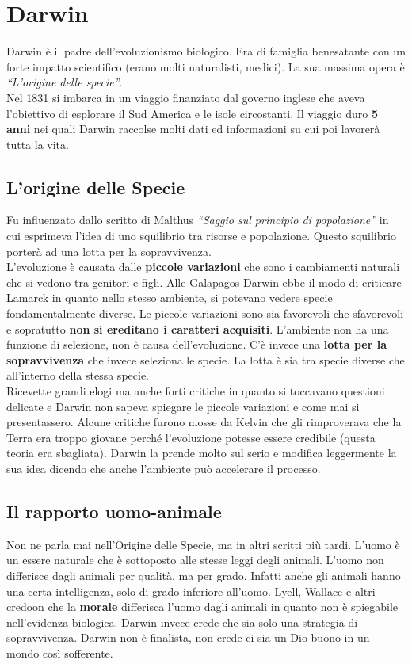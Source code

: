 
\section{Darwin}
Darwin è il padre dell'evoluzionismo biologico. Era di famiglia benesatante con un forte impatto
scientifico (erano molti naturalisti, medici). La sua massima opera è \textit{``L'origine delle 
specie''}.\\
Nel 1831 si imbarca in un viaggio finanziato dal governo inglese che aveva l'obiettivo di esplorare
il Sud America e le isole circostanti. Il viaggio duro \textbf{5 anni} nei quali Darwin raccolse 
molti dati ed informazioni su cui poi lavorerà tutta la vita.

\subsection{L'origine delle Specie}
Fu influenzato dallo scritto di Malthus \textit{``Saggio sul principio di popolazione''} in cui 
esprimeva l'idea di uno squilibrio tra risorse e popolazione. Questo squilibrio porterà ad una lotta
per la sopravvivenza.\\
L'evoluzione è causata dalle \textbf{piccole variazioni} che sono i cambiamenti naturali che si 
vedono tra genitori e figli. Alle Galapagos Darwin ebbe il modo di criticare Lamarck in quanto nello
stesso ambiente, si potevano vedere specie fondamentalmente diverse. Le piccole variazioni sono sia 
favorevoli che sfavorevoli e sopratutto \textbf{non si ereditano i caratteri acquisiti}. L'ambiente
non ha una funzione di selezione, non è causa dell'evoluzione. C'è invece una \textbf{lotta per la
sopravvivenza} che invece seleziona le specie. La lotta è sia tra specie diverse che all'interno 
della stessa specie.\\ [\baselineskip]
Ricevette grandi elogi ma anche forti critiche in quanto si toccavano questioni delicate e Darwin
non sapeva spiegare le piccole variazioni e come mai si presentassero. Alcune critiche furono mosse
da Kelvin che gli rimproverava che la Terra era troppo giovane perché l'evoluzione potesse essere
credibile (questa teoria era sbagliata). Darwin la prende molto sul serio e modifica leggermente la 
sua idea dicendo che anche l'ambiente può accelerare il processo.

\subsection{Il rapporto uomo-animale}
Non ne parla mai nell'Origine delle Specie, ma in altri scritti più tardi. L'uomo è un essere 
naturale che è sottoposto alle stesse leggi degli animali. L'uomo non differisce dagli animali per
qualità, ma per grado. Infatti anche gli animali hanno una certa intelligenza, solo di grado 
inferiore all'uomo. Lyell, Wallace e altri credoon che la \textbf{morale} differisca l'uomo dagli 
animali in quanto non è spiegabile nell'evidenza biologica. Darwin invece crede che sia solo una
strategia di sopravvivenza. Darwin non è finalista, non crede ci sia un Dio buono in un mondo così
sofferente.
